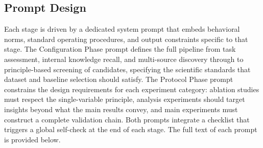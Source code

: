 \subsection{Prompt Design}

Each stage is driven by a dedicated system prompt that embeds behavioral norms, standard operating procedures, and output constraints specific to that stage. The Configuration Phase prompt defines the full pipeline from task assessment, internal knowledge recall, and multi-source discovery through to principle-based screening of candidates, specifying the scientific standards that dataset and baseline selection should satisfy. The Protocol Phase prompt constrains the design requirements for each experiment category: ablation studies must respect the single-variable principle, analysis experiments should target insights beyond what the main results convey, and main experiments must construct a complete validation chain. Both prompts integrate a checklist that triggers a global self-check at the end of each stage. The full text of each prompt is provided below.

